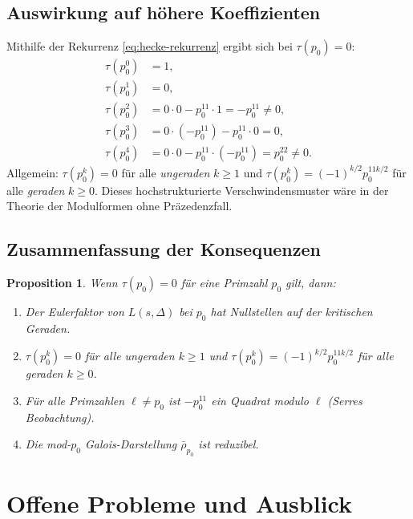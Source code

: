 \documentclass[12pt,a4paper]{amsart}
\newtheorem{proposition}[theorem]{Proposition}
\theoremstyle{definition}
\begin{document}
\subsection{Auswirkung auf höhere Koeffizienten}

Mithilfe der Rekurrenz \eqref{eq:hecke-rekurrenz} ergibt sich bei $\tau(p_0) = 0$:
\begin{align*}
  \tau(p_0^0) &= 1, \\
  \tau(p_0^1) &= 0, \\
  \tau(p_0^2) &= 0 \cdot 0 - p_0^{11} \cdot 1 = -p_0^{11} \neq 0, \\
  \tau(p_0^3) &= 0 \cdot (-p_0^{11}) - p_0^{11} \cdot 0 = 0, \\
  \tau(p_0^4) &= 0 \cdot 0 - p_0^{11} \cdot (-p_0^{11}) = p_0^{22} \neq 0.
\end{align*}
Allgemein: $\tau(p_0^k) = 0$ für alle \emph{ungeraden} $k \geq 1$ und
$\tau(p_0^k) = (-1)^{k/2} p_0^{11k/2}$ für alle \emph{geraden} $k \geq 0$. Dieses
hochstrukturierte Verschwindensmuster wäre in der Theorie der Modulformen ohne
Präzedenzfall.

\subsection{Zusammenfassung der Konsequenzen}

\begin{proposition}\label{prop:konsequenzen}
  Wenn $\tau(p_0) = 0$ für eine Primzahl $p_0$ gilt, dann:
  \begin{enumerate}[label=(\roman*)]
    \item Der Eulerfaktor von $L(s,\Delta)$ bei $p_0$ hat Nullstellen auf der
          kritischen Geraden.
    \item $\tau(p_0^k) = 0$ für alle \emph{ungeraden} $k \geq 1$ und
          $\tau(p_0^k) = (-1)^{k/2} p_0^{11k/2}$ für alle geraden $k \geq 0$.
    \item Für alle Primzahlen $\ell \neq p_0$ ist $-p_0^{11}$ ein Quadrat modulo $\ell$
          (Serres Beobachtung).
    \item Die mod-$p_0$ Galois-Darstellung $\bar\rho_{p_0}$ ist reduzibel.
  \end{enumerate}
\end{proposition}

\section{Offene Probleme und Ausblick}
\end{document}
